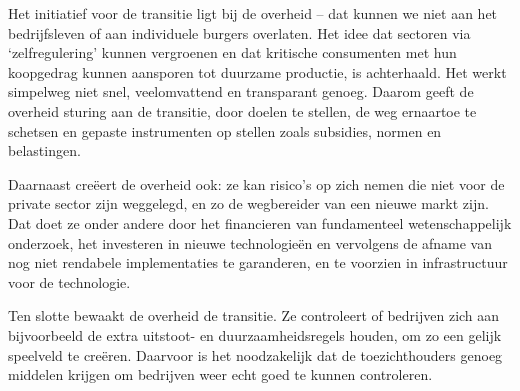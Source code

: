 
Het initiatief voor de transitie ligt bij de overheid – dat kunnen we niet aan het bedrijfsleven of aan individuele burgers overlaten. Het idee dat sectoren via ‘zelfregulering’ kunnen vergroenen en dat kritische consumenten met hun koopgedrag kunnen aansporen tot duurzame productie, is achterhaald. Het werkt simpelweg niet snel, veelomvattend en transparant genoeg. Daarom geeft de overheid sturing aan de transitie, door doelen te stellen, de weg ernaartoe te schetsen en gepaste instrumenten op stellen zoals subsidies, normen en belastingen.

Daarnaast creëert de overheid ook: ze kan risico’s op zich nemen die niet voor de private sector zijn weggelegd, en zo de wegbereider van een nieuwe markt zijn. Dat doet ze onder andere door het financieren van fundamenteel wetenschappelijk onderzoek, het investeren in nieuwe technologieën en vervolgens de afname van nog niet rendabele implementaties te garanderen, en te voorzien in infrastructuur voor de technologie.

Ten slotte bewaakt de overheid de transitie. Ze controleert of bedrijven zich aan bijvoorbeeld de extra uitstoot- en duurzaamheidsregels houden, om zo een gelijk speelveld te creëren. Daarvoor is het noodzakelijk dat de toezichthouders genoeg middelen krijgen om bedrijven weer echt goed te kunnen controleren.
